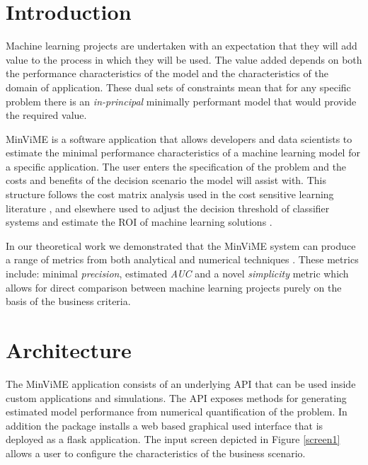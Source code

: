 \documentclass[preprint,12pt, a4paper]{elsarticle}
\begin{document}

\noindent

\section{Introduction}

Machine learning projects are undertaken with an expectation
that they will add value to the process in which they will be used.
The value added depends on both the performance characteristics of the model
and the characteristics of the domain of application. These dual sets
of constraints mean that for any specific problem there is an
{\it in-principal} minimally performant model that would provide the required
value.

MinViME is a software application that allows developers and data scientists
to estimate the minimal performance characteristics of a machine learning
model for a specific application. The user enters the specification of the problem
and the costs and benefits of the decision scenario the model will assist with.
This structure follows the cost matrix analysis used in the cost sensitive learning
literature \cite{Domingos1999,Margineantu2000,Elkan2001,Tian+Zhang2019}, and
elsewhere used to adjust the decision threshold of classifier systems \cite{Nikolaou2016}
and estimate the ROI of machine learning solutions \cite{Ylijoki2018}.
 
In our theoretical work we demonstrated that the MinViME system can produce a range of metrics 
from both analytical and numerical techniques \cite{Hawkins2020}. These metrics include: 
minimal \textit{precision}, estimated \textit{AUC} and a novel \textit{simplicity}  
metric which allows for direct comparison between machine learning projects purely 
on the basis of the business criteria.

\section{Architecture}

The MinViME application consists of an underlying API that can be used inside custom
applications and simulations. The API exposes methods for generating estimated model
performance from numerical quantification of the problem.
In addition the package installs a web based graphical
used interface that is deployed as a flask application. The input screen depicted
in Figure \ref{screen1} allows a user to configure the characteristics of the business
scenario. 
\end{document}

